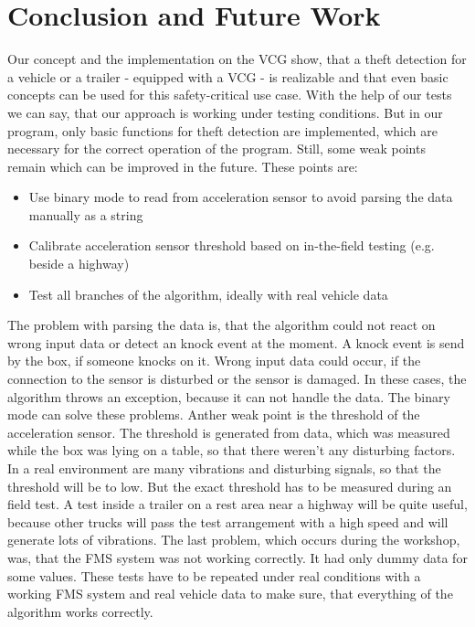 \chapter{Conclusion and Future Work}
Our concept and the implementation on the VCG show, that a theft detection for a vehicle or a trailer - equipped with a VCG - is realizable and that even basic concepts can be used for this safety-critical use case. With the help of our tests we can say, that our approach is working under testing conditions. But in our program, only basic functions for theft detection are implemented, which are necessary for the correct operation of the program. Still, some weak points remain which can be improved in the future. These points are:

\begin{itemize}
	\item Use binary mode to read from acceleration sensor to avoid parsing the data manually as a string
	\item Calibrate acceleration sensor threshold based on in-the-field testing (e.g. beside a highway)
	\item Test all branches of the algorithm, ideally with real vehicle data
\end{itemize}

The problem with parsing the data is, that the algorithm could not react on wrong input data or detect an knock event at the moment. A knock event is send by the box, if someone knocks on it. Wrong input data could occur, if the connection to the sensor is disturbed or the sensor is damaged. In these cases, the algorithm throws an exception, because it can not handle the data. The binary mode can solve these problems. Anther weak point is the threshold of the acceleration sensor. The threshold is generated from data, which was measured while the box was lying on a table, so that there weren't any disturbing factors. In a real environment are many vibrations and disturbing signals, so that the threshold will be to low. But the exact threshold has to be measured during an field test. A test inside a trailer on a rest area near a highway will be quite useful, because other trucks will pass the test arrangement with a high speed and will generate lots of vibrations. The last problem, which occurs during the workshop, was, that the FMS system was not working correctly. It had only dummy data for some values. These tests have to be repeated under real conditions with a working FMS system and real vehicle data to make sure, that everything of the algorithm works correctly.

